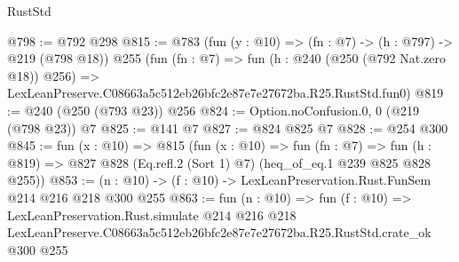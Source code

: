 \begin{lexlean}{RustStd}
\begin{coremodule}
@798 := @792 @298
@815 := @783
    (fun (y : @10) => (fn : @7) -> (h : @797) -> @219 (@798 @18))
    @255
    (fun (fn : @7) =>
    fun (h : @240 (@250 (@792 Nat.zero @18)) @256) =>
    LexLeanPreserve.C08663a5c512eb26bfc2e87e7e27672ba.R25.RustStd.fun0)
@819 := @240 (@250 (@793 @23)) @256
@824 := Option.noConfusion.{0, 0} (@219 (@798 @23)) @7
@825 := @141 @7
@827 := @824 @825 @7
@828 := @254 @300
@845 := fun (x : @10) =>
  @815
    (fun (x : @10) =>
    fun (fn : @7) =>
    fun (h : @819) => @827 @828 (Eq.refl.{2} (Sort 1) @7) (heq_of_eq.{1} @239 @825 @828 @255))
@853 := (n : @10) -> (f : @10) -> LexLeanPreservation.Rust.FunSem @214 @216 @218 @300 @255
@863 := fun (n : @10) =>
  fun (f : @10) =>
  LexLeanPreservation.Rust.simulate
    @214
    @216
    @218
    LexLeanPreserve.C08663a5c512eb26bfc2e87e7e27672ba.R25.RustStd.crate_ok
    @300
    @255
\end{coremodule}
\end{lexlean}
